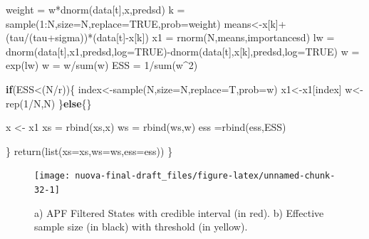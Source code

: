 \documentclass[
]{book}
\newenvironment{Shaded}{\begin{snugshade}}{\end{snugshade}}
\newcommand{\AttributeTok}[1]{\textcolor[rgb]{0.77,0.63,0.00}{#1}}
\newcommand{\ConstantTok}[1]{\textcolor[rgb]{0.00,0.00,0.00}{#1}}
\newcommand{\ControlFlowTok}[1]{\textcolor[rgb]{0.13,0.29,0.53}{\textbf{#1}}}
\newcommand{\DecValTok}[1]{\textcolor[rgb]{0.00,0.00,0.81}{#1}}
\newcommand{\FunctionTok}[1]{\textcolor[rgb]{0.00,0.00,0.00}{#1}}
\newcommand{\NormalTok}[1]{#1}
\newcommand{\OtherTok}[1]{\textcolor[rgb]{0.56,0.35,0.01}{#1}}
\newcommand{\SpecialCharTok}[1]{\textcolor[rgb]{0.00,0.00,0.00}{#1}}
\theoremstyle{break}
\theoremstyle{nonumberplain}
\begin{document}
\begin{Shaded}
\begin{Highlighting}[]
\NormalTok{    weight }\OtherTok{=}\NormalTok{ w}\SpecialCharTok{*}\FunctionTok{dnorm}\NormalTok{(data[t],x,predsd)}
\NormalTok{    k   }\OtherTok{=} \FunctionTok{sample}\NormalTok{(}\DecValTok{1}\SpecialCharTok{:}\NormalTok{N,}\AttributeTok{size=}\NormalTok{N,}\AttributeTok{replace=}\ConstantTok{TRUE}\NormalTok{,}\AttributeTok{prob=}\NormalTok{weight)}
\NormalTok{    means}\OtherTok{\textless{}{-}}\NormalTok{x[k]}\SpecialCharTok{+}\NormalTok{(tau}\SpecialCharTok{/}\NormalTok{(tau}\SpecialCharTok{+}\NormalTok{sigma))}\SpecialCharTok{*}\NormalTok{(data[t]}\SpecialCharTok{{-}}\NormalTok{x[k])}
\NormalTok{    x1   }\OtherTok{=} \FunctionTok{rnorm}\NormalTok{(N,means,importancesd)}
\NormalTok{    lw  }\OtherTok{=} \FunctionTok{dnorm}\NormalTok{(data[t],x1,predsd,}\AttributeTok{log=}\ConstantTok{TRUE}\NormalTok{)}\SpecialCharTok{{-}}\FunctionTok{dnorm}\NormalTok{(data[t],x[k],predsd,}\AttributeTok{log=}\ConstantTok{TRUE}\NormalTok{)}
\NormalTok{    w   }\OtherTok{=} \FunctionTok{exp}\NormalTok{(lw)}
\NormalTok{    w   }\OtherTok{=}\NormalTok{ w}\SpecialCharTok{/}\FunctionTok{sum}\NormalTok{(w)}
\NormalTok{    ESS  }\OtherTok{=} \DecValTok{1}\SpecialCharTok{/}\FunctionTok{sum}\NormalTok{(w}\SpecialCharTok{\^{}}\DecValTok{2}\NormalTok{)}
    
    \ControlFlowTok{if}\NormalTok{(ESS}\SpecialCharTok{\textless{}}\NormalTok{(N}\SpecialCharTok{/}\NormalTok{r))\{}
\NormalTok{      index}\OtherTok{\textless{}{-}}\FunctionTok{sample}\NormalTok{(N,}\AttributeTok{size=}\NormalTok{N,}\AttributeTok{replace=}\NormalTok{T,}\AttributeTok{prob=}\NormalTok{w)}
\NormalTok{      x1}\OtherTok{\textless{}{-}}\NormalTok{x1[index]}
\NormalTok{      w}\OtherTok{\textless{}{-}}\FunctionTok{rep}\NormalTok{(}\DecValTok{1}\SpecialCharTok{/}\NormalTok{N,N)}
\NormalTok{    \}}\ControlFlowTok{else}\NormalTok{\{\}}
    
\NormalTok{    x }\OtherTok{\textless{}{-}}\NormalTok{ x1}
\NormalTok{    xs }\OtherTok{=} \FunctionTok{rbind}\NormalTok{(xs,x)}
\NormalTok{    ws }\OtherTok{=} \FunctionTok{rbind}\NormalTok{(ws,w)}
\NormalTok{    ess }\OtherTok{=}\FunctionTok{rbind}\NormalTok{(ess,ESS)}

\NormalTok{  \}}
  \FunctionTok{return}\NormalTok{(}\FunctionTok{list}\NormalTok{(}\AttributeTok{xs=}\NormalTok{xs,}\AttributeTok{ws=}\NormalTok{ws,}\AttributeTok{ess=}\NormalTok{ess))}
\NormalTok{\}}
\end{Highlighting}
\end{Shaded}

\begin{figure}[H]

{\centering \texttt{[image: nuova-final-draft\_files/figure-latex/unnamed-chunk-32-1]} 

}

\caption{a) APF Filtered States with credible interval (in red). b) Effective sample size (in black) with threshold (in yellow).}\label{fig:unnamed-chunk-32}
\end{figure}
\end{document}
